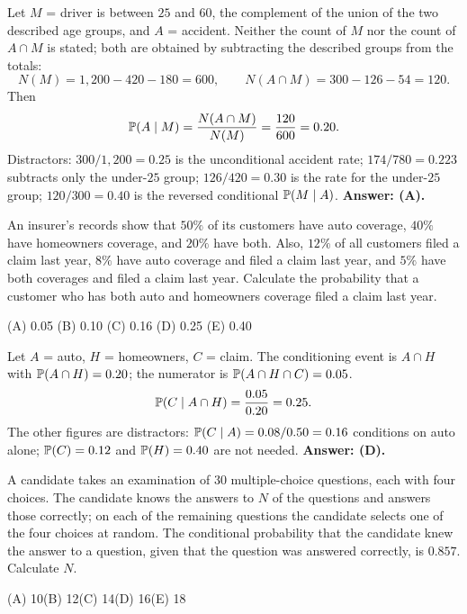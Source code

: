 \begin{solution}
Let $M$ = driver is between $25$ and $60$, the complement of the union of the
two described age groups, and $A$ = accident. Neither the count of $M$ nor the
count of $A \cap M$ is stated; both are obtained by subtracting the described
groups from the totals:
\[
N(M) = 1{,}200 - 420 - 180 = 600, \qquad
N(A \cap M) = 300 - 126 - 54 = 120 .
\]
Then
\[
\mathbb{P}(A \mid M) = \frac{N(A \cap M)}{N(M)} = \frac{120}{600} = 0.20 .
\]
Distractors: $300/1{,}200 = 0.25$ is the unconditional accident rate;
$174/780 = 0.223$ subtracts only the under-$25$ group; $126/420 = 0.30$ is the
rate for the under-$25$ group; $120/300 = 0.40$ is the reversed conditional
$\mathbb{P}(M \mid A)$.
\textbf{Answer: (A).}
\end{solution}

\begin{example}
An insurer's records show that $50\%$ of its customers have auto coverage,
$40\%$ have homeowners coverage, and $20\%$ have both. Also, $12\%$ of all
customers filed a claim last year, $8\%$ have auto coverage and filed a claim
last year, and $5\%$ have both coverages and filed a claim last year. Calculate
the probability that a customer who has both auto and homeowners coverage filed
a claim last year.

\medskip
(A) 0.05 \quad (B) 0.10 \quad (C) 0.16 \quad (D) 0.25 \quad (E) 0.40
\end{example}

\begin{solution}
Let $A$ = auto, $H$ = homeowners, $C$ = claim. The conditioning event is
$A \cap H$ with $\mathbb{P}(A \cap H) = 0.20$; the numerator is $\mathbb{P}(A \cap H \cap C) = 0.05$.
\[
\mathbb{P}(C \mid A \cap H) = \frac{0.05}{0.20} = 0.25 .
\]
The other figures are distractors: $\mathbb{P}(C \mid A) = 0.08/0.50 = 0.16$ conditions
on auto alone; $\mathbb{P}(C) = 0.12$ and $\mathbb{P}(H) = 0.40$ are not needed.
\textbf{Answer: (D).}
\end{solution}

\begin{example}
A candidate takes an examination of $30$ multiple-choice questions, each
with four choices. The candidate knows the answers to $N$ of the questions and
answers those correctly; on each of the remaining questions the candidate
selects one of the four choices at random. The conditional probability that
the candidate knew the answer to a question, given that the question was
answered correctly, is $0.857$. Calculate $N$.

\medskip
(A) 10\qquad (B) 12\qquad (C) 14\qquad (D) 16\qquad (E) 18
\end{example}

